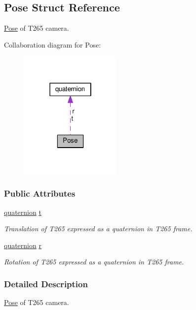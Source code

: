 \hypertarget{structPose}{}\subsection{Pose Struct Reference}
\label{structPose}


\hyperlink{structPose}{Pose} of T265 camera.  




Collaboration diagram for Pose\+:\nopagebreak
\begin{figure}[H]
\begin{center}
\leavevmode
\includegraphics[width=142pt]{structPose__coll__graph}
\end{center}
\end{figure}
\subsubsection*{Public Attributes}
\begin{DoxyCompactItemize}
\item 
\hyperlink{classquaternion}{quaternion} \hyperlink{structPose_aa87ab4baa5bab93b316c8ef417b6f1ef}{t}
\begin{DoxyCompactList}\small\item\em Translation of T265 expressed as a quaternion in T265 frame. \end{DoxyCompactList}\item 
\hyperlink{classquaternion}{quaternion} \hyperlink{structPose_ac86b5844a0203b03971005be99e59388}{r}
\begin{DoxyCompactList}\small\item\em Rotation of T265 expressed as a quaternion in T265 frame. \end{DoxyCompactList}\end{DoxyCompactItemize}


\subsubsection{Detailed Description}
\hyperlink{structPose}{Pose} of T265 camera. 

